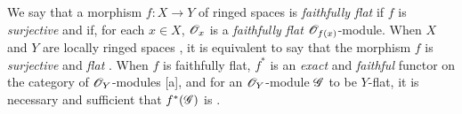 \begin{env}[6.7.8]
\label{0.6.7.8}
We say that a morphism $f:X\to Y$ of ringed spaces is {\em faithfully flat} if $f$ is
{\em surjective} and if, for each $x\in X$, $\mathscr{O}_x$ is a {\em faithfully flat}
$\mathscr{O}_{f(x)}$-module. When $X$ and $Y$ are locally ringed spaces , it is
equivalent to say that the morphism $f$ is {\em surjective} and {\em flat}
. When $f$ is faithfully flat, $f^*$ is an {\em exact} and {\em faithful}
functor on the category of $\mathscr{O}_Y$-modules [a], and for an $\mathscr{O}_Y$-module
$\mathscr{G}$ to be $Y$-flat, it is necessary and sufficient that $f^*(\mathscr{G})$ is
.
\end{env}

